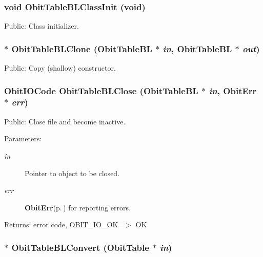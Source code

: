 \subsubsection{\setlength{\rightskip}{0pt plus 5cm}void Obit\-Table\-BLClass\-Init (void)}\label{ObitTableBL_8h_a10}


Public: Class initializer. 

\subsubsection{$\ast$ Obit\-Table\-BLClone ({\bf Obit\-Table\-BL} $\ast$ {\em in}, {\bf Obit\-Table\-BL} $\ast$ {\em out})}\label{ObitTableBL_8h_a15}


Public: Copy (shallow) constructor. 

\subsubsection{\setlength{\rightskip}{0pt plus 5cm}Obit\-IOCode Obit\-Table\-BLClose ({\bf Obit\-Table\-BL} $\ast$ {\em in}, {\bf Obit\-Err} $\ast$ {\em err})}\label{ObitTableBL_8h_a21}


Public: Close file and become inactive. 

\begin{Desc}
\item[Parameters:]
\begin{description}
\item[{\em in}]Pointer to object to be closed. \item[{\em err}]{\bf Obit\-Err}{\rm (p.\,\pageref{structObitErr})} for reporting errors. \end{description}
\end{Desc}
\begin{Desc}
\item[Returns:]error code, OBIT\_\-IO\_\-OK=$>$ OK \end{Desc}
\subsubsection{$\ast$ Obit\-Table\-BLConvert ({\bf Obit\-Table} $\ast$ {\em in})}\label{ObitTableBL_8h_a16}


